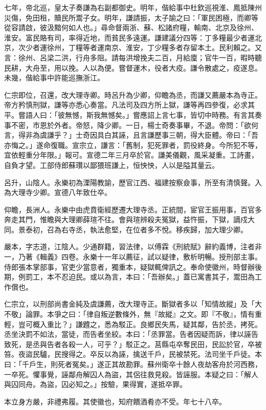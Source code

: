 \begin{pinyinscope}
七年，帝北巡，皇太子奏謙為右副都御史。明年，偕給事中杜欽巡視淮、鳳抵陳州災傷，免田租，贖民所鬻子女。明年，謙請振，太子諭之曰：「軍民困極，而卿等從容請啟，彼汲黯何如人也。」尋命督兩浙、蘇、松諸府糧，輸南、北京及徐州、淮安。富民賂有司，率得近地，而貧民多遠運。謙建議分四等：丁多糧最少者運北京，次少者運徐州，丁糧等者運南京、淮安，丁少糧多者存留本土。民利賴之。又言：徐州、呂梁二洪，行舟多阻。請每洪增挽夫二百，月給廩；官牛一百，暇時聽民耕，大舟至，用以挽。人以為便。嘗督運木，役者大疫。謙令散處之，疫遂息。未幾，偕給事中許能巡撫浙江。

仁宗即位，召還，改大理寺卿。時呂升為少卿，仰瞻為丞，而謙又薦嚴本為寺正。帝方矜慎刑獄，謙等亦悉心奏當。凡法司及四方所上獄，謙等再四參復，必求其平。嘗語人曰：「彼無憾，斯我無憾矣。」嘗應詔上言七事，皆切中時務。有言其奏事不密，市恩於外者。帝怒，降少卿。一日，楊士奇奏事畢，不退。帝問：「欲何言，得非為虞謙乎？」士奇因具白其誣，且言謙歷事三朝，得大臣體。帝曰：「吾亦悔之。」遂命復職。宣宗立，謙言：「舊制，犯死罪者，罰役終身。今所犯不等，宜依輕重分年限。」報可。宣德二年三月卒於官。謙美儀觀，風采凝重。工詩畫，自負才望。工部侍郎蘇瓚以鄙猥班謙上，恒怏怏，人以是隘其量云。

呂升，山陰人。永樂初為溧陽教諭，歷官江西、福建按察僉事，所至有清慎聲。入為大理寺少卿。宣德八年致仕卒。

仰瞻，長洲人。永樂中由虎賁衛經歷遷大理寺丞。正統間，宦官王振用事，百官多奔走其門，惟瞻與大理卿薛瑄不往。會與瑄辨殺夫冤獄，益忤振，下獄，謫戍大同。景泰初，召為右寺丞，執法愈堅，在位者多不悅。移疾歸，加大理少卿。

嚴本，字志道，江陰人。少通群籍，習法律，以傅霖《刑統賦》辭約義博，注者非一，乃著《輯義》四卷。永樂十一年以薦征，試以疑律，敷析明暢。授刑部主事。侍郎張本掌部事，官吏少當意者，獨重本，疑獄輒俾訊之。奉命使徽州，時督辦後期，例罰工，本不忍迫民。或以為言，本曰：「吾辦矣。」蓋已寓書其子，鬻田為工作償也。

仁宗立，以刑部尚書金純及虞謙薦，改大理寺正。斷獄者多以「知情故縱」及「大不敬」論罪。本爭之曰：「律自叛逆數條外，無『故縱』之文。即『不敬』，情有重輕，豈可概入重比？」謙韙之，悉為駁正。良鄉民失馬，疑其鄰，告於丞，拷死。丞坐決罰不如法，當徒，而告者坐絞。本曰：「丞罪當。告者因疑而訴，律以誣告致死，是丞與告者各殺一人，可乎？」駁正之。莒縣屯卒奪民田，民訟於官，卒被笞。夜盜民驢，民搜得之。卒反以為誣，擒送千戶，民被禁死。法司坐千戶徒。本曰：「千戶生，則死者冤矣。」遂正其故勘罪。蘇州衛卒十餘人夜劫客舟於河西務，一卒死。懼事覺，誣鄰舟解囚人為盜，其侶往救見殺。皆誣服。本疑之曰：「解人與囚同舟。為盜，囚必知之。」按驗，果得實，遂抵卒罪。

本立身方嚴，非禮弗履。其使徽也，知府饋酒肴亦不受。年七十八卒。


\end{pinyinscope}
